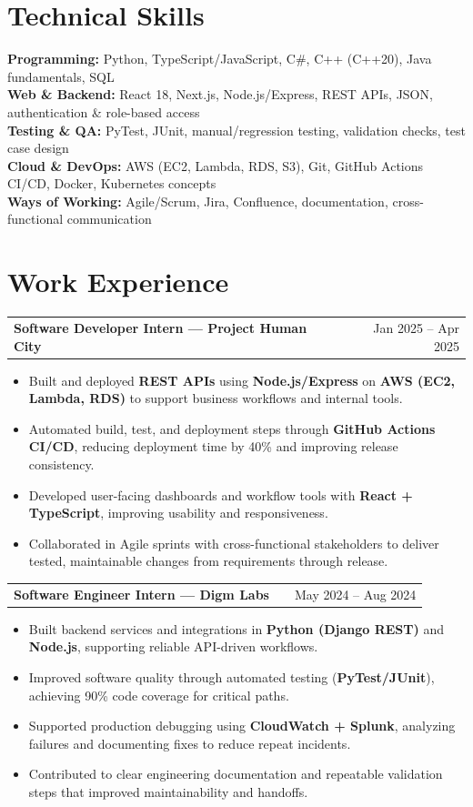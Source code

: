 \documentclass[a4paper,11pt]{article}
\makeatletter
\newenvironment{joblong}[2]
  {\begin{tabularx}{\linewidth}{@{}l X r@{}}\textbf{#1} & \hfill & #2 \\[-2pt]\end{tabularx}
   \begin{minipage}[t]{\linewidth}\begin{itemize}[nosep,leftmargin=1em,itemsep=1pt,label=--]}
  {\end{itemize}\end{minipage}}
\makeatother
\begin{document}
\section*{Technical Skills}
\textbf{Programming:} Python, TypeScript/JavaScript, C\#, C++ (C++20), Java fundamentals, SQL \\
\textbf{Web \& Backend:} React 18, Next.js, Node.js/Express, REST APIs, JSON, authentication \& role-based access \\
\textbf{Testing \& QA:} PyTest, JUnit, manual/regression testing, validation checks, test case design \\
\textbf{Cloud \& DevOps:} AWS (EC2, Lambda, RDS, S3), Git, GitHub Actions CI/CD, Docker, Kubernetes concepts \\
\textbf{Ways of Working:} Agile/Scrum, Jira, Confluence, documentation, cross-functional communication

\section{Work Experience}

\begin{joblong}{Software Developer Intern — Project Human City}{Jan 2025 -- Apr 2025}
\item Built and deployed \textbf{REST APIs} using \textbf{Node.js/Express} on \textbf{AWS (EC2, Lambda, RDS)} to support business workflows and internal tools.
\item Automated build, test, and deployment steps through \textbf{GitHub Actions CI/CD}, reducing deployment time by 40\% and improving release consistency.
\item Developed user-facing dashboards and workflow tools with \textbf{React + TypeScript}, improving usability and responsiveness.
\item Collaborated in Agile sprints with cross-functional stakeholders to deliver tested, maintainable changes from requirements through release.
\end{joblong}

\vspace{3pt}

\begin{joblong}{Software Engineer Intern — Digm Labs}{May 2024 -- Aug 2024}
\item Built backend services and integrations in \textbf{Python (Django REST)} and \textbf{Node.js}, supporting reliable API-driven workflows.
\item Improved software quality through automated testing (\textbf{PyTest/JUnit}), achieving 90\% code coverage for critical paths.
\item Supported production debugging using \textbf{CloudWatch + Splunk}, analyzing failures and documenting fixes to reduce repeat incidents.
\item Contributed to clear engineering documentation and repeatable validation steps that improved maintainability and handoffs.
\end{joblong}
\end{document}
